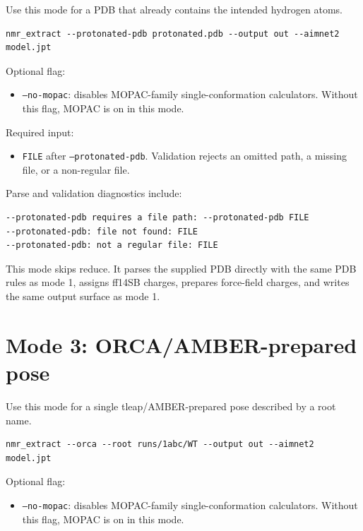 \documentclass[11pt]{article}
\begin{document}
Use this mode for a PDB that already contains the intended hydrogen atoms.

\begin{lstlisting}
nmr_extract --protonated-pdb protonated.pdb --output out --aimnet2 model.jpt
\end{lstlisting}

Optional flag:

\begin{itemize}
\item \texttt{--no-mopac}: disables MOPAC-family single-conformation
  calculators. Without this flag, MOPAC is on in this mode.
\end{itemize}

Required input:

\begin{itemize}
\item \texttt{FILE} after \texttt{--protonated-pdb}. Validation rejects an
  omitted path, a missing file, or a non-regular file.
\end{itemize}

Parse and validation diagnostics include:

\begin{lstlisting}
--protonated-pdb requires a file path: --protonated-pdb FILE
--protonated-pdb: file not found: FILE
--protonated-pdb: not a regular file: FILE
\end{lstlisting}

This mode skips reduce. It parses the supplied PDB directly with the same PDB
rules as mode 1, assigns ff14SB charges, prepares force-field charges, and
writes the same output surface as mode 1.

\section{Mode 3: ORCA/AMBER-prepared pose}

Use this mode for a single tleap/AMBER-prepared pose described by a root name.

\begin{lstlisting}
nmr_extract --orca --root runs/1abc/WT --output out --aimnet2 model.jpt
\end{lstlisting}

Optional flag:

\begin{itemize}
\item \texttt{--no-mopac}: disables MOPAC-family single-conformation
  calculators. Without this flag, MOPAC is on in this mode.
\end{itemize}
\end{document}

